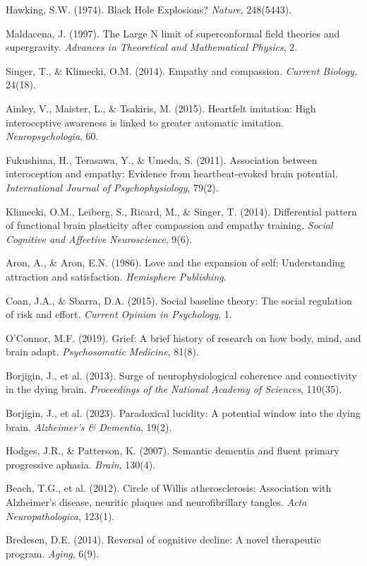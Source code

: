  Hawking, S.W. (1974). Black Hole Explosions? \emph{Nature}, 248(5443).

 Maldacena, J. (1997). The Large N limit of superconformal field theories and supergravity. \emph{Advances in Theoretical and Mathematical Physics}, 2.

 Singer, T., \& Klimecki, O.M. (2014). Empathy and compassion. \emph{Current Biology}, 24(18).

 Ainley, V., Maister, L., \& Tsakiris, M. (2015). Heartfelt imitation: High interoceptive awareness is linked to greater automatic imitation. \emph{Neuropsychologia}, 60.

 Fukushima, H., Terasawa, Y., \& Umeda, S. (2011). Association between interoception and empathy: Evidence from heartbeat-evoked brain potential. \emph{International Journal of Psychophysiology}, 79(2).

 Klimecki, O.M., Leiberg, S., Ricard, M., \& Singer, T. (2014). Differential pattern of functional brain plasticity after compassion and empathy training. \emph{Social Cognitive and Affective Neuroscience}, 9(6).

 Aron, A., \& Aron, E.N. (1986). Love and the expansion of self: Understanding attraction and satisfaction. \emph{Hemisphere Publishing}.

 Coan, J.A., \& Sbarra, D.A. (2015). Social baseline theory: The social regulation of risk and effort. \emph{Current Opinion in Psychology}, 1.

 O’Connor, M.F. (2019). Grief: A brief history of research on how body, mind, and brain adapt. \emph{Psychosomatic Medicine}, 81(8).

 Borjigin, J., et al. (2013). Surge of neurophysiological coherence and connectivity in the dying brain. \emph{Proceedings of the National Academy of Sciences}, 110(35).

 Borjigin, J., et al. (2023). Paradoxical lucidity: A potential window into the dying brain. \emph{Alzheimer’s \& Dementia}, 19(2).

 Hodges, J.R., \& Patterson, K. (2007). Semantic dementia and fluent primary progressive aphasia. \emph{Brain}, 130(4).

 Beach, T.G., et al. (2012). Circle of Willis atherosclerosis: Association with Alzheimer’s disease, neuritic plaques and neurofibrillary tangles. \emph{Acta Neuropathologica}, 123(1).

 Bredesen, D.E. (2014). Reversal of cognitive decline: A novel therapeutic program. \emph{Aging}, 6(9).

